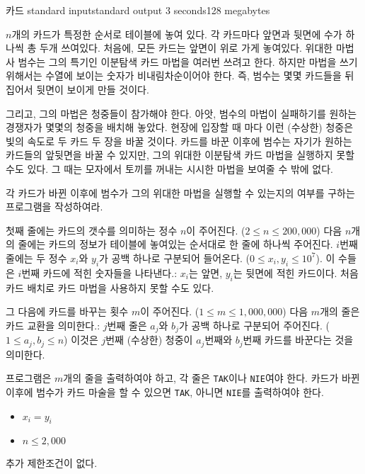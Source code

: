 \begin{problem}{카드}
	{standard input}{standard output}
	{3 seconds}{128 megabytes}{}
	
	$n$개의 카드가 특정한 순서로 테이블에 놓여 있다. 각 카드마다 앞면과 뒷면에 수가 하나씩 총 두개 쓰여있다. 처음에, 모든 카드는 앞면이 위로 가게 놓여있다. 위대한 마법사 범수는 그의 특기인 이분탐색 카드 마법을 여러번 쓰려고 한다. 하지만 마법을 쓰기 위해서는 수열에 보이는 숫자가 비내림차순이어야 한다. 즉, 범수는 몇몇 카드들을 뒤집어서 뒷면이 보이게 만들 것이다.
	
	그리고, 그의 마법은 청중들이 참가해야 한다. 아앗, 범수의 마법이 실패하기를 원하는 경쟁자가 몇몇의 청중을 배치해 놓았다. 현장에 입장할 때 마다 이런 (수상한) 청중은 빛의 속도로 두 카드 두 장을 바꿀 것이다. 카드를 바꾼 이후에 범수는 자기가 원하는 카드들의 앞뒷면을 바꿀 수 있지만, 그의 위대한 이분탐색 카드 마법을 실행하지 못할 수도 있다. 그 때는 모자에서 토끼를 꺼내는 시시한 마법을 보여줄 수 밖에 없다.
	
	각 카드가 바뀐 이후에 범수가 그의 위대한 마법을 실행할 수 있는지의 여부를 구하는 프로그램을 작성하여라.
	
	\InputFile
	
	첫째 줄에는 카드의 갯수를 의미하는 정수 $n$이 주어진다. ($2 \le n \le 200,000$) 다음 $n$개의 줄에는 카드의 정보가 테이블에 놓여있는 순서대로 한 줄에 하나씩 주어진다. $i$번째 줄에는 두 정수 $x_i$와 $y_i$가 공백 하나로 구분되어 들어온다. ($0 \le x_i, y_i \le 10^7$). 이 수들은 $i$번째 카드에 적힌 숫자들을 나타낸다.: $x_i$는 앞면, $y_i$는 뒷면에 적힌 카드이다. 처음 카드 배치로 카드 마법을 사용하지 못할 수도 있다.
	
	그 다음에 카드를 바꾸는 횟수 $m$이 주어진다. ($1 \le m \le 1,000,000$) 다음 $m$개의 줄은 카드 교환을 의미한다.: $j$번째 줄은 $a_j$와 $b_j$가 공백 하나로 구분되어 주어진다. ($1 \le a_j, b_j \le n$) 이것은 $j$번째 (수상한) 청중이 $a_j$번째와 $b_j$번째 카드를 바꾼다는 것을 의미한다.
	
	
	
	\OutputFile
	
	프로그램은 $m$개의 줄을 출력하여야 하고, 각 줄은 \texttt{TAK}이나 \texttt{NIE}여야 한다. 카드가 바뀐 이후에 범수가 카드 마술을 할 수 있으면 \texttt{TAK}, 아니면 \texttt{NIE}를 출력하여야 한다.
	
	
	\begin{itemize}
		\item $x_i = y_i$
	\end{itemize}
	
	\begin{itemize}
		\item $n \le 2,000$
	\end{itemize}
	
	
	추가 제한조건이 없다.
	
	\Examples
		
	\begin{example}
	\end{example}
	
	
\end{problem}

